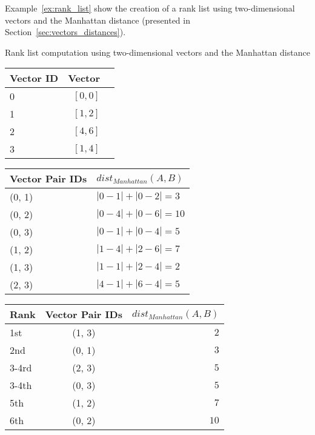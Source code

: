 Example~\ref{ex:rank_list} show the creation of a rank list using two-dimensional vectors and the Manhattan distance (presented in Section~\ref{sec:vectors_distances}).

\begin{example}
  \centering
  \caption{Rank list computation using two-dimensional vectors and the Manhattan distance}
  \label{ex:rank_list}

  \begin{subexample}{\linewidth}
    \centering
    \begin{tabular}{l r r}
      \toprule
      Vector ID & Vector \\
      \midrule
      0 & $[0, 0]$ \\
      1 & $[1, 2]$ \\
      2 & $[4, 6]$ \\
      3 & $[1, 4]$ \\
      \bottomrule
    \end{tabular}
  \end{subexample}

  \vspace{0.5cm}

  \begin{subexample}{\linewidth}
    \centering
    \begin{tabular}{l l}
      \toprule
      Vector Pair IDs & $dist_{Manhattan}(A, B)$ \\
      \midrule
      (0, 1) & $|0-1| + |0-2| = 3$ \\
      (0, 2) & $|0-4| + |0-6| = 10$ \\
      (0, 3) & $|0-1| + |0-4| = 5$ \\
      (1, 2) & $|1-4| + |2-6| = 7$ \\
      (1, 3) & $|1-1| + |2-4| = 2$ \\
      (2, 3) & $|4-1| + |6-4| = 5$ \\
      \bottomrule
    \end{tabular}
  \end{subexample}

  \vspace{0.5cm}

  \begin{subexample}{\linewidth}
    \centering
    \begin{tabular}{l c r}
      \toprule
      Rank & Vector Pair IDs & $dist_{Manhattan}(A, B)$ \\
      \midrule
      1st   & (1, 3) & $2$ \\
      2nd   & (0, 1) & $3$ \\
      3-4rd & (2, 3) & $5$ \\
      3-4th & (0, 3) & $5$ \\
      5th   & (1, 2) & $7$ \\
      6th   & (0, 2) & $10$ \\
      \bottomrule
    \end{tabular}
  \end{subexample}
\end{example}

